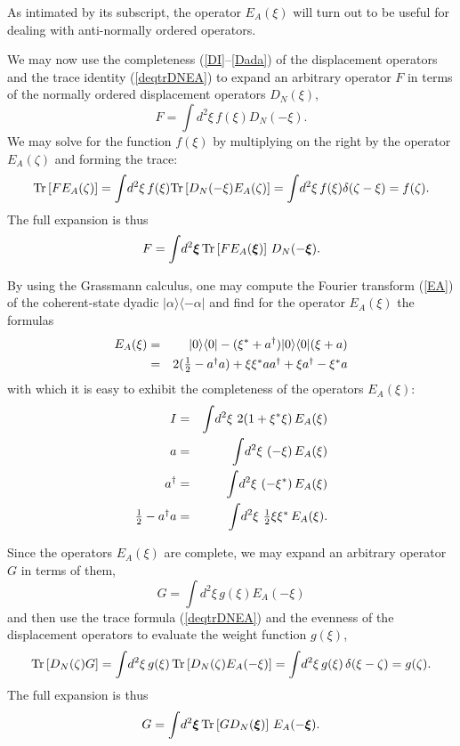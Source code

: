 \documentclass[12pt]{article}
\def\beq{\begin{equation}}
\def\eeq{\end{equation}}
\def\bea{\begin{eqnarray}}
\def\eea{\end{eqnarray}}
\def\a{\alpha}
\def\ad{a^\dgr}
\def\d{\delta}
\def\z{\zeta}
\def\x{\xi}
\def\bx{{\mbox{\boldmath$\xi$}}}
\def\xs{\xi^*}
\def\dgr{\dagger}
\def\Tr{{\rm Tr}}
\def\thalf{\textstyle{ {1 \over 2} } }
\def\G{Grassmann }
\def\co_st{coherent-state}
\def\disp{displacement }
\def\op{operator }
\def\ops{operators }
\begin{document}
As intimated by its subscript,
the operator $ E_A( \x ) $ will turn out 
to be useful for dealing with anti-normally ordered operators.
\par
We may now use the completeness (\ref {DI}--\ref {Dada})
of the \disp \ops and the trace identity (\ref {deqtrDNEA}) 
to expand an arbitrary \op $ F $ in terms of the
normally ordered \disp \ops $ D_N( \x ) $,
\beq
F = \int \! d^2\x \, f ( \x ) D_N( - \x ) .
\label {FfDN}
\eeq
We may solve for the function $ f ( \x ) $ by multiplying
on the right
by the \op $ E_A( \z ) $ and forming the trace:
\beq
\Tr \left[ F E_A( \z ) \right] =
\int \! d^2\x \, f ( \x ) \Tr \left[ D_N( - \x ) E_A( \z ) \right] 
= \int \! d^2\x \, f ( \x ) \d( \z - \x ) = f ( \z ) .
\label {f(z)}
\eeq
The full expansion is thus
\beq
F = \int \! d^2\bx \, \Tr \left[ F E_A( \bx ) \right]
\, D_N( - \bx ) .
\label {FTrDN}
\eeq 
\par
By using the \G calculus,
one may compute the Fourier transform
(\ref {EA}) of the \co_st dyadic $ | \a \rangle \langle - \a |$
and find for the \op $ E_A( \x ) $ the formulas
\bea
E_A( \x ) & = & | 0 \rangle \langle 0 |
- ( \xs + \ad ) | 0 \rangle \langle 0 | ( \x + a ) \\
& = & 2 ( \thalf - \ad a )
+ \x \xs a \ad + \x \ad - \xs a 
\label {EAada}
\eea
with which it is easy to exhibit 
the completeness of the \ops $ E_A( \x ) $:
\bea
I & = & \int \! d^2\x \,\, 2 ( 1 + \xs \x ) \, E_A( \x ) \\
a & = & \int \! d^2\x \,\, ( - \x ) \, E_A( \x ) \\
\ad & = & \int \! d^2\x \,\, ( - \xs ) \, E_A( \x ) \\
\thalf - \ad a & = & \int \! d^2\x \,\, \thalf \x \xs \, E_A( \x ) .
\label {EAcompl}
\eea
\par
Since the \ops $ E_A( \x ) $ are complete,
we may expand an arbitrary \op $ G $ in terms of them,
\beq
G = \int \! d^2\x \, g( \x ) E_A( - \x ) 
\label {GEA}
\eeq
and then use the trace formula (\ref {deqtrDNEA})
and the evenness of the displacement operators
to evaluate the weight function $ g( \x ) $,
\beq
\Tr \left[ D_N( \z ) G \right] = 
\int \! d^2\x \, g( \x ) \, \Tr \left[ D_N( \z ) E_A( - \x ) \right]
= \int \! d^2\x \, g( \x ) \, \d( \x - \z ) 
= g( \z ) .
\label {g}
\eeq
The full expansion is thus
\beq
G = \int \! d^2\bx \, \Tr \left[ G D_N( \bx ) \right] \,
E_A( - \bx ) .
\label {EAexp}
\eeq
\end{document}
